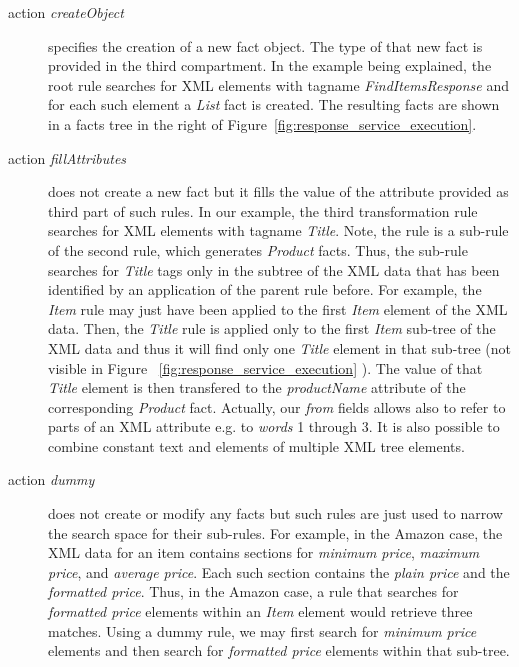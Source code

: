 \documentclass{fast_latex}
\begin{document}
\begin{description}
	\item[action \emph{createObject}] specifies the creation of a new fact object. The type of that new fact is provided in the third compartment. In the example being explained, the root rule searches for XML elements with tagname \emph{FindItemsResponse} and for each such element a \emph{List} fact is created. The resulting facts are shown in a facts tree in the right of Figure~\ref{fig:response_service_execution}.
	\item[action \emph{fillAttributes}] does not create a new fact but it fills the value of the attribute provided as third part of such rules. In our example, the third transformation rule searches for XML elements with tagname \emph{Title}. Note, the rule is a sub-rule of the second rule, which generates \emph{Product} facts. Thus, the sub-rule searches for \emph{Title} tags only in the subtree of the XML data that has been identified by an application of the parent rule before. For example, the \emph{Item} rule may just have been applied to the first \emph{Item} element of the XML data. Then, the \emph{Title} rule is applied only to the first \emph{Item} sub-tree of the XML data and thus it will find only one \emph{Title} element in that sub-tree (not visible in Figure ~\ref{fig:response_service_execution} ). The value of that \emph{Title} element is then transfered to the \emph{productName} attribute of the corresponding \emph{Product} fact. Actually, our \textit{from} fields allows also to refer to parts of an XML attribute e.g. to \textit{words} 1 through 3. It is also possible to combine constant text and elements of multiple XML tree elements. 
	\item[action \emph{dummy}] does not create or modify any facts but such rules are just used to narrow the search space for their sub-rules. For example, in the Amazon case, the XML data for an item contains sections for \emph{minimum price}, \emph{maximum price}, and \emph{average price}. Each such section contains the \emph{plain price} and the \emph{formatted price}. Thus, in the Amazon case, a rule that searches for \emph{formatted price} elements within an \emph{Item} element would retrieve three matches. Using a dummy rule, we may first search for \emph{minimum price} elements and then search for \emph{formatted price} elements within that sub-tree.
\end{description}
\end{document}
